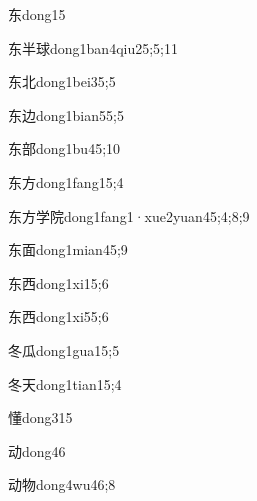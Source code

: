 \begin{verbete}{东}{dong1}{5}
\end{verbete}
\begin{verbete}{东半球}{dong1ban4qiu2}{5;5;11}
\end{verbete}
\begin{verbete}{东北}{dong1bei3}{5;5}
\end{verbete}
\begin{verbete}{东边}{dong1bian5}{5;5}
\end{verbete}
\begin{verbete}{东部}{dong1bu4}{5;10}
\end{verbete}
\begin{verbete}{东方}{dong1fang1}{5;4}
\end{verbete}
\begin{verbete}{东方学院}{dong1fang1·xue2yuan4}{5;4;8;9}
\end{verbete}
\begin{verbete}{东面}{dong1mian4}{5;9}
\end{verbete}
\begin{verbete}{东西}{dong1xi1}{5;6}
\end{verbete}
\begin{verbete}{东西}{dong1xi5}{5;6}
\end{verbete}
\begin{verbete}{冬瓜}{dong1gua1}{5;5}
\end{verbete}
\begin{verbete}{冬天}{dong1tian1}{5;4}
\end{verbete}
\begin{verbete}{懂}{dong3}{15}
\end{verbete}
\begin{verbete}{动}{dong4}{6}
\end{verbete}
\begin{verbete}{动物}{dong4wu4}{6;8}
\end{verbete}
